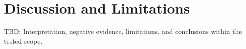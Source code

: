 \section{Discussion and Limitations}
TBD: Interpretation, negative evidence, limitations, and conclusions within the tested scope.
